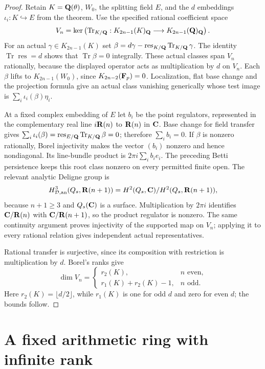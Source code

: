 \begin{proof}
Retain $K=\mathbf Q(\theta)$, $W_0$, the splitting field $E$, and the
$d$ embeddings $\iota_i:K\hookrightarrow E$ from the theorem.
Use the specified rational coefficient space
\[
 V_n=\ker\left(\operatorname{Tr}_{K/\mathbf Q}:
       K_{2n-1}(K)_{\mathbf Q}\longrightarrow K_{2n-1}(\mathbf Q)_{\mathbf Q}\right).
\]
For an actual $\gamma\in K_{2n-1}(K)$ set
$\beta=d\gamma-\operatorname{res}_{K/\mathbf Q}
                 \operatorname{Tr}_{K/\mathbf Q}\gamma$.
The identity $\operatorname{Tr}\operatorname{res}=d$ shows
that $\operatorname{Tr}\beta=0$ integrally. These actual
classes span $V_n$ rationally, because the displayed operator
acts as multiplication by $d$ on $V_n$.
Each $\beta$ lifts to $K_{2n-1}(W_0)$, since
$K_{2n-2}(\mathbf F_p)=0$. Localization, flat base change and the
projection formula give an actual class vanishing generically whose
test image is $\sum_i\iota_i(\beta)\eta_i$.

At a fixed complex embedding of $E$ let $b_i$ be the point
regulators, represented in the complementary real line
$i\mathbf R(n)$ to $\mathbf R(n)$ in $\mathbf C$. Base change for field transfer
gives $\sum_i\iota_i(\beta)=
\operatorname{res}_{E/\mathbf Q}\operatorname{Tr}_{K/\mathbf Q}\beta=0$;
therefore $\sum_i b_i=0$. If $\beta$ is nonzero rationally,
Borel injectivity \cite[Section~6]{BunkeTamme} makes the vector
$(b_i)$ nonzero and hence nondiagonal. Its line-bundle product is
$2\pi i\sum_i b_i e_i$. The preceding Betti persistence
keeps this root class nonzero on every permitted finite open.
The relevant analytic Deligne group is
\[
 H^3_{\mathcal D,\mathrm{an}}(Q_s,\mathbf R(n+1))
   =H^2(Q_s,\mathbf C)/H^2(Q_s,\mathbf R(n+1)),
\]
because $n+1\ge3$ and $Q_s(\mathbf C)$ is a surface.
Multiplication by $2\pi i$ identifies
$\mathbf C/\mathbf R(n)$ with $\mathbf C/\mathbf R(n+1)$, so the product regulator
is nonzero. The same continuity argument proves injectivity
of the supported map on $V_n$; applying it to every rational
relation gives independent actual representatives.

Rational transfer is surjective, since its composition with
restriction is multiplication by $d$. Borel's ranks
\cite[Proposition~12.2]{Borel} give
\[
 \dim V_n=
 \begin{cases}
 r_2(K),&n\text{ even},\\
 r_1(K)+r_2(K)-1,&n\text{ odd}.
 \end{cases}
\]
Here $r_2(K)=\lfloor d/2\rfloor$, while $r_1(K)$ is one for odd $d$ and zero for even $d$; the bounds follow.
\end{proof}

\section{A fixed arithmetic ring with infinite rank}
\label{d2ext:sec-strict-coefficients}

